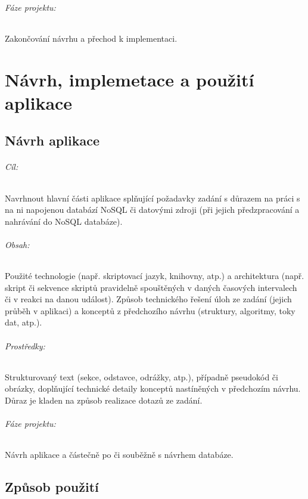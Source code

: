 \documentclass[10pt,xcolor=pdflatex,dvipsnames,table,oneside]{book}
\begin{document}
\paragraph{Fáze projektu:}
Zakončování návrhu a přechod k implementaci.

\part{Návrh, implemetace a použití aplikace}

\chapter{Návrh aplikace}

\paragraph{Cíl:}
Navrhnout hlavní části aplikace splňující požadavky zadání s důrazem na práci s na ni napojenou databází NoSQL či datovými zdroji
(při jejich předzpracování a nahrávání do NoSQL databáze).

\paragraph{Obsah:}
Použité technologie (např. skriptovací jazyk, knihovny, atp.)
a architektura (např. skript či sekvence skriptů pravidelně spouštěných v daných časových intervalech či v reakci na danou událost).
Způsob technického řešení úloh ze zadání (jejich průběh v aplikaci) a konceptů z předchozího návrhu (struktury, algoritmy, toky dat, atp.).

\paragraph{Prostředky:}
Strukturovaný text (sekce, odstavce, odrážky, atp.), případně pseudokód či obrázky, doplňující technické detaily konceptů nastíněných v předchozím návrhu.
Důraz je kladen na způsob realizace dotazů ze zadání.

\paragraph{Fáze projektu:}
Návrh aplikace a částečně po či souběžně s návrhem databáze.

\chapter{Způsob použití}
\end{document}

